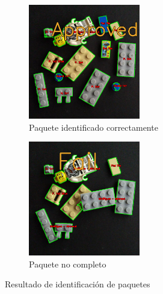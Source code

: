 \documentclass[letterpaper]{scrreprt}
\begin{document}
\begin{figure}[H]
	\begin{subfigure}{0.5\textwidth}
		\centering
		\includegraphics[width=0.8\linewidth, height=5cm]{Process/FinalApproved_response.png} 
		\caption{Paquete identificado correctamente}
		\label{fig:subim10}
	\end{subfigure}
	\begin{subfigure}{0.5\textwidth}
		\centering
		\includegraphics[width=0.8\linewidth, height=5cm]{Process/FinalFail_response.png} 
		\caption{Paquete no completo}
		\label{fig:subim11}
	\end{subfigure}
	\caption{Resultado de identificación de paquetes}
	\label{fig:image3}
\end{figure}




%
%
\end{document}
